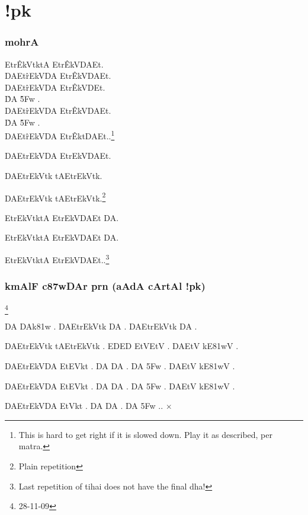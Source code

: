 \def\DevnagVersion{2.17}\documentclass{tufte-book}
\def\samaindent{\parindent=0.5in}
\def\dnitem#1{\noindent\llap{#1\space}\leftskip\parindent}
\begin{document}
\dnsamaveda

{\dn
\chapter{!pk}}

\subsection{ {\dn mohrA}}

{\dn \dnnum
{\dnsamaveda \samaindent
\dnitem{\rn{2}}

Etr\^{EkV}{}tktA Etr\^{EkV}{}DAEt.\\
DAEt\^{rEk}{}VDA Etr\^{EkV}{}DAEt.\\
DAEt\^{rEk}{}VDA Etr\^{EkV}{}DEt.\\
\hspace{0.25in} \^{DA}{} \hspace{0.5in} \^{\35Fw}{} \hspace{0.25in}.\\
DAEt\^{rEk}{}VDA Etr\^{EkV}{}DAEt.\\
\hspace{0.25in} \^{DA}{} \hspace{0.5in} \^{\35Fw}{} \hspace{0.25in}.\\
DAEt\^{rEk}{}VDA Etr\^{Ekt}{}DAEt..\footnote{This is hard to get right if it is slowed down. Play it as
described, per matra.}
\\}}


{\dn \dnnum
{\dnsamaveda \samaindent
\dnitem{\rn{3}}

DAEtrEkVDA EtrEkVDAEt.

DAEtrEkVtk tAEtrEkVtk.

DAEtrEkVtk tAEtrEkVtk.\footnote{Plain repetition}

EtrEkVtktA EtrEkVDAEt DA.

EtrEkVtktA EtrEkVDAEt DA.

EtrEkVtktA EtrEkVDAEt..\footnote{Last repetition of tihai does not have the final dha!}

}}

\subsection{ {\dn kmAlF c\387wDAr prn {\rs (\re}aAdA cArtAl !pk{\rs )\re}}}


{\dn \dnnum
{\dnsamaveda %
\dnitem{\rn{1}}\footnote{28-11-09}

DA DAk\381w . DAEtrEkVtk DA . DAEtrEkVtk DA .

DAEtrEkVtk tAEtrEkVtk . ED\2ED\2 EtVEtV . DAEtV kE\381wV .

DAEtrEkVDA EtEVkt . DA DA . DA \35Fw . DAEtV kE\381wV .

DAEtrEkVDA EtEVkt . DA DA . DA \35Fw . DAEtV kE\381wV .

DAEtrEkVDA EtVkt . DA DA . DA \35Fw ..  {\NormalFont $\times$} 

}}
\end{document}
